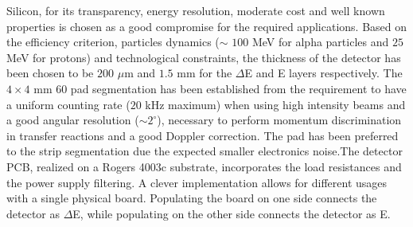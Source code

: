 Silicon, for its transparency, energy resolution, moderate cost and
well known properties is chosen as a good compromise for the required
applications. Based on the efficiency criterion, particles dynamics ($\sim$
$100$ MeV for alpha particles and $25$ MeV for protons) and technological
constraints, the thickness of the detector has been chosen to be $200$ $\mu$m
and $1.5$ mm for the $\Delta$E and E layers respectively. The $4 \times 4$ mm
60 pad segmentation has been established from the requirement to have a uniform
counting rate ($20$ kHz maximum) when using high intensity beams and a good
angular resolution ($\sim 2^\circ$), necessary to perform momentum
discrimination in transfer reactions and a good Doppler correction. The pad
has been preferred to the strip segmentation due the expected smaller
electronics noise.The detector PCB, realized on a Rogers 4003c substrate,
incorporates the load resistances and the power supply filtering. A clever
implementation allows for different usages with a single physical board.
Populating the board on one side connects the detector as $\Delta$E, while
populating on the other side connects the detector as E.
